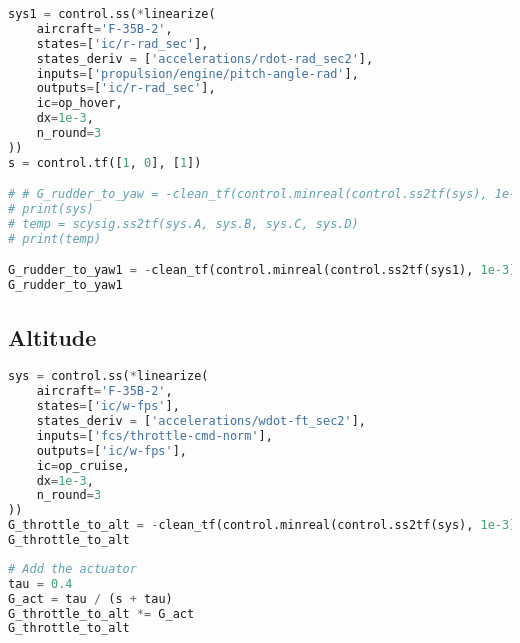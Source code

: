 \begin{lstlisting}[language=Python]
sys1 = control.ss(*linearize(
    aircraft='F-35B-2',
    states=['ic/r-rad_sec'],
    states_deriv = ['accelerations/rdot-rad_sec2'],
    inputs=['propulsion/engine/pitch-angle-rad'],
    outputs=['ic/r-rad_sec'],
    ic=op_hover,
    dx=1e-3,
    n_round=3
))
s = control.tf([1, 0], [1])

# # G_rudder_to_yaw = -clean_tf(control.minreal(control.ss2tf(sys), 1e-3))/s
# print(sys)
# temp = scysig.ss2tf(sys.A, sys.B, sys.C, sys.D)
# print(temp)

G_rudder_to_yaw1 = -clean_tf(control.minreal(control.ss2tf(sys1), 1e-3))/s
G_rudder_to_yaw1
\end{lstlisting}

\hypertarget{altitude-1}{%
\subsection{Altitude}\label{altitude-1}}

\begin{lstlisting}[language=Python]
sys = control.ss(*linearize(
    aircraft='F-35B-2',
    states=['ic/w-fps'],
    states_deriv = ['accelerations/wdot-ft_sec2'],
    inputs=['fcs/throttle-cmd-norm'],
    outputs=['ic/w-fps'],
    ic=op_cruise,
    dx=1e-3,
    n_round=3
))
G_throttle_to_alt = -clean_tf(control.minreal(control.ss2tf(sys), 1e-3))/s
G_throttle_to_alt
\end{lstlisting}

\begin{lstlisting}[language=Python]
# Add the actuator 
tau = 0.4
G_act = tau / (s + tau)
G_throttle_to_alt *= G_act
G_throttle_to_alt
\end{lstlisting}

